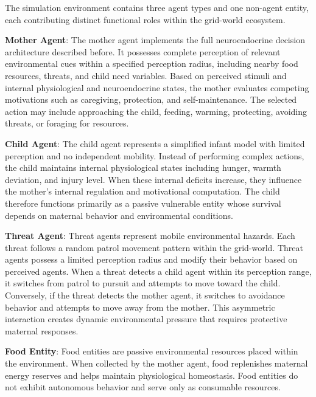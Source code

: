     

The simulation environment contains three agent types and one non-agent 
entity, each contributing distinct functional roles within the grid-world 
ecosystem.

\textbf{Mother Agent}: The mother agent implements the full neuroendocrine 
decision architecture described before. 
It possesses complete perception of relevant environmental cues within a 
specified perception radius, including nearby food resources, threats, and 
child need variables. Based on perceived stimuli and internal 
physiological and neuroendocrine states, the mother evaluates competing 
motivations such as caregiving, protection, and self-maintenance. The 
selected action may include approaching the child, feeding, warming, 
protecting, avoiding threats, or foraging for resources.



\textbf{Child Agent}: The child agent represents a simplified infant model 
with limited perception and no independent mobility. Instead of performing 
complex actions, the child maintains internal physiological states including 
hunger, warmth deviation, and injury level. When these internal deficits 
increase, they influence the mother’s internal regulation and motivational computation. The child therefore functions primarily as a passive vulnerable entity whose survival depends on maternal behavior and environmental conditions.

\textbf{Threat Agent}: Threat agents represent mobile environmental hazards. 
Each threat follows a random patrol movement pattern within the grid-world. 
Threat agents possess a limited perception radius and modify their behavior 
based on perceived agents. When a threat detects a child agent within its 
perception range, it switches from patrol to pursuit and attempts to move 
toward the child. Conversely, if the threat detects the mother agent, it 
switches to avoidance behavior and attempts to move away from the mother. 
This asymmetric interaction creates dynamic environmental pressure that 
requires protective maternal responses.

\textbf{Food Entity}: Food entities are passive environmental resources placed 
within the environment. When collected by the mother agent, food replenishes 
maternal energy reserves and helps maintain physiological homeostasis. Food 
entities do not exhibit autonomous behavior and serve only as consumable 
resources.



